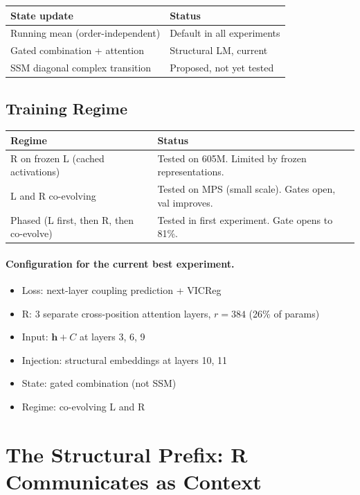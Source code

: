 \documentclass[11pt, a4paper]{article}
\newcommand{\h}{\mathbf{h}}
\theoremstyle{plain}
\theoremstyle{definition}
\theoremstyle{remark}
\begin{document}
\begin{center}\small
\begin{tabular}{ll}
\toprule
\textbf{State update} & \textbf{Status} \\
\midrule
Running mean (order-independent) & Default in all experiments \\
Gated combination + attention & Structural LM, current \\
SSM diagonal complex transition & Proposed, not yet tested \\
\bottomrule
\end{tabular}
\end{center}

\subsection{Training Regime}

\begin{center}\small
\begin{tabular}{ll}
\toprule
\textbf{Regime} & \textbf{Status} \\
\midrule
R on frozen L (cached activations) & Tested on 605M. Limited by frozen representations. \\
L and R co-evolving & Tested on MPS (small scale). Gates open, val improves. \\
Phased (L first, then R, then co-evolve) & Tested in first experiment. Gate opens to 81\%. \\
\bottomrule
\end{tabular}
\end{center}

\paragraph{Configuration for the current best experiment.}
\begin{itemize}[nosep]
\item Loss: next-layer coupling prediction + VICReg
\item R: 3 separate cross-position attention layers, $r = 384$ (26\% of params)
\item Input: $\h + C$ at layers 3, 6, 9
\item Injection: structural embeddings at layers 10, 11
\item State: gated combination (not SSM)
\item Regime: co-evolving L and R
\end{itemize}


\section{The Structural Prefix: R Communicates as Context}
\label{app:structural-prefix}
\end{document}
